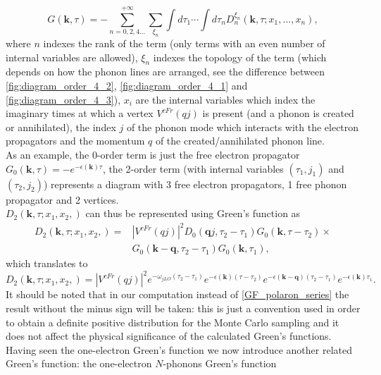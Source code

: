 \begin{equation}
    G(\mathbf{k},\tau)=-\sum_{n=0,2,4...}^{+\infty}\sum_{\xi_n}\int d\tau_1\cdots\int d\tau_n D_n^{\xi_n}(\mathbf{k},\tau;x_1,...,x_n),
    \label{GF_polaron_series}
\end{equation}
where $n$ indexes the rank of the term (only terms with an even number of internal variables are allowed), $\xi_n$ indexes the topology of the 
term (which depends on how the phonon lines are arranged, see the difference between \ref{fig:diagram_order_4_2}, \ref{fig:diagram_order_4_1} and 
\ref{fig:diagram_order_4_3}), $x_i$ are the internal variables which index the imaginary times at which a vertex $V^{cFr}(qj)$ is 
present (and a phonon is created or annihilated), the index $j$ of the phonon mode which interacts with the electron propagators and the momentum $q$ of the created/annihilated 
phonon line.\\
As an example, the 0-order term is just the free electron propagator $G_0(\mathbf{k},\tau)=-e^{-\epsilon(\mathbf{k})\tau}$, the 2-order term 
(with internal variables $(\tau_1,j_1)$ and $(\tau_2,j_2)$) represents a diagram with 3 free electron propagators, 1 free phonon propagator and 2 vertices.\\
$D_2(\mathbf{k},\tau;x_1,x_2,)$ can thus be represented using Green's function as
\begin{equation}
\begin{split}
    D_2(\mathbf{k},\tau;x_1,x_2,)=&|V^{cFr}(qj)|^2D_0(\mathbf{q}j,\tau_2-\tau_1)G_0(\mathbf{k},\tau-\tau_2)\times\\
    &G_0(\mathbf{k-q},\tau_2-\tau_1)G_0(\mathbf{k},\tau_1),
\end{split}
\end{equation}
which translates to
\begin{equation}
    D_2(\mathbf{k},\tau;x_1,x_2,)=|V^{cFr}(qj)|^2e^{-\omega_{jLO}(\tau_2-\tau_1)}e^{-\epsilon(\mathbf{k})(\tau-\tau_2)}e^{-\epsilon(\mathbf{k-q})(\tau_2-\tau_1)}e^{-\epsilon(\mathbf{k})\tau_1}.
\end{equation}
It should be noted that in our computation instead of \ref{GF_polaron_series} the result without the minus sign will be taken: this is just a convention 
used in order to obtain a definite positive distribution for the Monte Carlo sampling and it does not affect the physical significance of the calculated Green's functions.\\
Having seen the one-electron Green's function we now introduce another related Green's function: the one-electron $N$-phonons Green's function 
